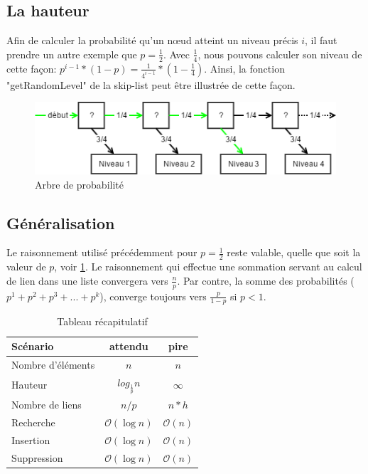 \documentclass[hidelinks,a4paper, 12pt]{article}
\begin{document}
	
	\subsection{La hauteur}
	 Afin de calculer la probabilité qu'un nœud atteint un niveau précis $i$, il faut prendre un autre exemple que $p=\frac{1}{2}$. Avec $\frac{1}{4}$, nous pouvons calculer son niveau de cette façon: ${p^{i-1}*(1-p)} = \frac{1}{{4}^{i-1}}*(1-\frac{1}{4}) $. Ainsi, la fonction "getRandomLevel" de la skip-list peut être illustrée de cette façon.
	 
	 \begin{figure}[h]
	 	\includegraphics[width=\textwidth]{img/probatree}
	 	\caption{Arbre de probabilité}
	 	\label{ProbaTree}
	 \end{figure}
	 
	 \subsection{Généralisation}
	 Le raisonnement utilisé précédemment pour $p=\frac{1}{2}$ reste valable, quelle que soit la valeur de $p$, voir \cref{recap}. Le raisonnement qui effectue une sommation servant au calcul de lien dans une liste convergera vers $\frac{n}{p}$. Par contre, la somme des probabilités ($p^1 + p^2 + p^3 + ... + p^k$), converge toujours vers $\frac{p}{1-p}$ si $p<1$. 
	 
	 
	 \begin{table}[h]
	 \begin{tabular}{|l|c|c|}
	 	\hline
	 	Scénario & attendu & pire \\
	 	\hline
	 	Nombre d'éléments & $n$ & $n$ \\ 
	 	\hline
	 	Hauteur & $log_{\frac{1}{p}} n$ & $\infty$\footnotemark  \\ 
	 	\hline
	 	Nombre de liens & $n/p$ & $n*h$ \\ 
	 	\hline
	 	Recherche & $\mathcal{O}(\log n)$ & $\mathcal{O}(n)$ \\ 
	 	\hline
	 	Insertion & $\mathcal{O}(\log n)$ & $\mathcal{O}(n)$ \\
	 	\hline
	 	Suppression & $\mathcal{O}(\log n)$ & $\mathcal{O}(n)$\\
	 	\hline
	 \end{tabular}
	 \caption{Tableau récapitulatif}
	 \label{recap}
	 
	 \end{table}
	 
\end{document}
